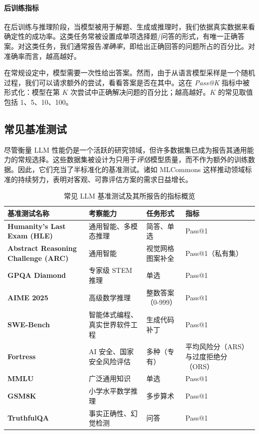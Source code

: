 \paragraph{后训练指标}
在后训练与推理阶段，当模型被用于解题、生成或推理时，我们依据真实数据来看确定性的成功率。这类任务常被设置成单项选择题/问答的形式，有唯一正确答案。对这类任务，我们通常报告{\em 准确率}，即给出正确回答的问题所占的百分比。对准确率而言，越高越好。

在常规设定中，模型需要一次性给出答案。然而，由于从语言模型采样是一个随机过程，我们可以请求额外的尝试，看看答案是否在其中。这在 {\em Pass@K} 指标中被形式化：模型在第 $K$ 次尝试中正确解决问题的百分比；越高越好。$K$ 的常见取值包括 1、5、10、100。

  

\subsection{常见基准测试}
尽管衡量 LLM 性能仍是一个活跃的研究领域，但许多数据集已成为报告其通用能力的常规选择。这些数据集被设计为只用于{\em 评估}模型质量，而不作为额外的训练数据。因此，它们充当了半标准化的基准测试。诸如 MLCommons \citep{thiyagalingam2022ai} 这样推动领域标准的持续努力，表明对客观、可靠评估方案的需求日益增长。


\begin{table}[tb]
    \centering
    \begin{tabular}{@{}p{}p{}p{}p{}@{}}
        \toprule
        \textbf{基准测试名称} & \textbf{考察能力} & \textbf{任务形式} & \textbf{指标} \\
        \midrule
        \textbf{Humanity's Last Exam (HLE)} & 通用智能、多模态推理 & 简答、单选 & Pass@1 \\
        \textbf{Abstract Reasoning Challenge (ARC)} & 通用智能 & 视觉网格图案补全 & Pass@1（私有集） \\
        \textbf{GPQA Diamond} & 专家级 STEM 推理 & 单选 & Pass@1 \\
        \textbf{AIME 2025} & 高级数学推理 & 整数答案（0-999） & Pass@1 \\
        \textbf{SWE-Bench} & 智能体式编程、真实世界软件工程 & 生成代码补丁 & Pass@1 \\
        \textbf{Fortress} & AI 安全、国家安全风险评估 & 多种（专有） & 平均风险分（ARS）与过度拒绝分（ORS） \\
        \textbf{MMLU} & 广泛通用知识 & 单选 & Pass@1 \\
        \textbf{GSM8K} & 小学水平数学推理 & 多步算术 & Pass@1 \\
        \textbf{TruthfulQA} & 事实正确性、幻觉检测 & 问答 & Pass@1 \\
        \bottomrule
    \end{tabular}
    \caption{常见 LLM 基准测试及其所报告的指标概览}
    \label{tab:llm-benchmarks}
\end{table}


